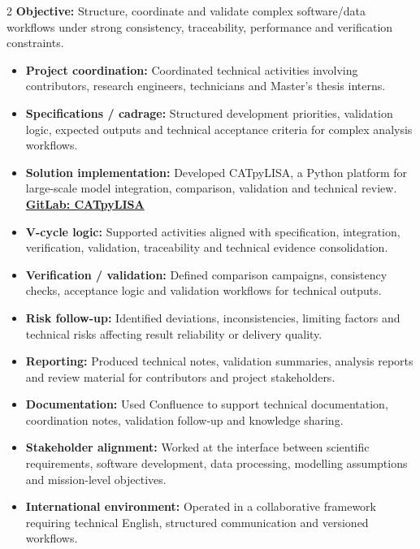 \documentclass[8pt,a4paper,ragged2e,withhyper]{altacv}
\begin{document}
\begin{paracol}{2}
\textbf{Objective:} Structure, coordinate and validate complex software/data workflows under strong consistency, traceability, performance and verification constraints.

\begin{itemize}
  \item \textbf{Project coordination:} Coordinated technical activities involving contributors, research engineers, technicians and Master's thesis interns.
  \item \textbf{Specifications / cadrage:} Structured development priorities, validation logic, expected outputs and technical acceptance criteria for complex analysis workflows.
  \item \textbf{Solution implementation:} Developed CATpyLISA, a Python platform for large-scale model integration, comparison, validation and technical review.
  \textcolor{DarkPastelRed}{\href{https://gitlab.oca.eu/gboileau/lisa_l3_tools}{\bf GitLab: CATpyLISA}}
  \item \textbf{V-cycle logic:} Supported activities aligned with specification, integration, verification, validation, traceability and technical evidence consolidation.
  \item \textbf{Verification / validation:} Defined comparison campaigns, consistency checks, acceptance logic and validation workflows for technical outputs.
  \item \textbf{Risk follow-up:} Identified deviations, inconsistencies, limiting factors and technical risks affecting result reliability or delivery quality.
  \item \textbf{Reporting:} Produced technical notes, validation summaries, analysis reports and review material for contributors and project stakeholders.
  \item \textbf{Documentation:} Used Confluence to support technical documentation, coordination notes, validation follow-up and knowledge sharing.
  \item \textbf{Stakeholder alignment:} Worked at the interface between scientific requirements, software development, data processing, modelling assumptions and mission-level objectives.
  \item \textbf{International environment:} Operated in a collaborative framework requiring technical English, structured communication and versioned workflows.
\end{itemize}

\divider



\end{paracol}
\end{document}
